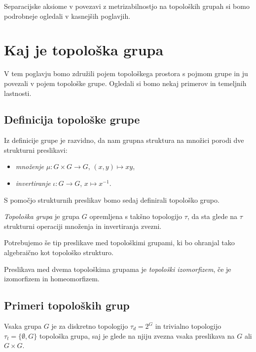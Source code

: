 \documentclass[mat1]{fmfdelo}
\begin{document}
Separacijske aksiome v povezavi z metrizabilnostjo na topoloških grupah si bomo podrobneje ogledali v kasnejših poglavjih.

\section{Kaj je topološka grupa}
V tem poglavju bomo združili pojem topološkega prostora s pojmom grupe in ju povezali v pojem topološke grupe. Ogledali si bomo nekaj primerov in temeljnih lastnosti.

\subsection{Definicija topološke grupe}
Iz definicije grupe je razvidno, da nam grupna struktura na množici porodi dve strukturni preslikavi:
\begin{itemize}
\item \emph{množenje} $\mu\colon G \times G \to G$, $(x, y) \mapsto xy$,
\item \emph{invertiranje} $\iota\colon G \to G$, $x \mapsto x^{-1}$.
\end{itemize}

S pomočjo strukturnih preslikav bomo sedaj definirali topološko grupo.
\begin{definicija}\label{def:topgrupa}
\emph{Topološka grupa} je grupa $G$ opremljena s takšno topologijo $\tau$, da sta glede na $\tau$ strukturni operaciji množenja in invertiranja zvezni. 
\end{definicija}

Potrebujemo še tip preslikave med topološkimi grupami, ki bo ohranjal tako algebraično kot topološko strukturo.
\begin{definicija}\label{def:topizo}
Preslikava med dvema topološkima grupama je \emph{to\-po\-loš\-ki izo\-mor\-fi\-zem}, če je izomorfizem in homeomorfizem.
\end{definicija}


\subsection{Primeri topoloških grup}

\begin{primer}
	Vsaka grupa $G$ je za diskretno topologijo $\tau_d = 2^G$ in trivialno topologijo $\tau_t = \lbrace \emptyset, G \rbrace$ topološka grupa, saj je glede na njiju zvezna vsaka preslikava na $G$ ali $G \times G$.
\end{primer}
\end{document}
